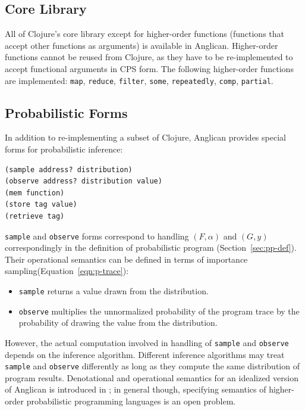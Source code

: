 \documentclass[preprint]{sigplanconf}
\begin{document}
\subsection{Core Library}
\label{sec:core}

All of Clojure's core library except for higher-order functions
(functions that accept other functions as arguments) is
available in Anglican. Higher-order functions cannot be reused
from Clojure, as they have to be re-implemented to accept
functional arguments in CPS form. The following higher-order
functions are implemented: \texttt{map}, \texttt{reduce},
\texttt{filter}, \texttt{some}, \texttt{repeatedly},
\texttt{comp}, \texttt{partial}.

\subsection{Probabilistic Forms}

In addition to re-implementing a subset of Clojure, Anglican
provides special forms for probabilistic inference:
\begin{lstlisting}[style=default]
(sample address? distribution)
(observe address? distribution value)
(mem function)
(store tag value)
(retrieve tag)
\end{lstlisting}

\texttt{sample} and \texttt{observe} forms correspond to
handling $(F, \alpha)$ and $(G, y)$ correspondingly in the
definition of probabilistic program (Section~\ref{sec:pp-def}).
Their operational semantics can be defined in terms of
importance sampling(Equation~\ref{eqn:p-trace}): 
\begin{itemize}
    \item \texttt{sample} returns a value drawn from
        the distribution.
    \item \texttt{observe} multiplies the unnormalized
        probability of the program trace by the probability of
        drawing the value from the distribution.
\end{itemize}
However, the actual computation involved in handling of
\texttt{sample} and \texttt{observe} depends on the inference
algorithm. Different inference algorithms may treat
\texttt{sample} and \texttt{observe} differently as long as they
compute the same distribution of program results.
Denotational and operational semantics for an idealized version
of Anglican is introduced in \cite{SYH+16}; in general though,
specifying semantics of higher-order probabilistic programming
languages is an open problem.
\end{document}

